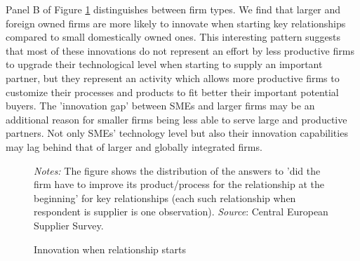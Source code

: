 \documentclass[final, dvipsnames, authoryear,12pt]{elsarticle}
\begin{document}
Panel B of Figure \ref{fig:innov} distinguishes between firm types. We find that larger and foreign owned firms are more likely to innovate when starting key relationships compared to small domestically owned ones. This interesting pattern suggests that most of these innovations do not represent an effort by less productive firms to upgrade their technological level when starting to supply an important partner, but they represent an activity which allows more productive firms to customize their processes and products to fit better their important potential buyers. The 'innovation gap' between SMEs and larger firms may be an additional reason for smaller firms being less able to serve large and productive partners. Not only SMEs' technology level but also their innovation capabilities may lag behind that of larger and globally integrated firms. 

    
 \begin{figure}[h]    
    \begin{center}
    \caption{Innovation when relationship starts}  
     \label{fig:innov}
    \end{center}
    {\footnotesize \textit{Notes:} The figure shows the distribution of the answers to ’did the firm have to improve its product/process for the relationship at the beginning’ for key relationships (each such relationship when respondent is supplier is one observation). \textit{Source}: Central European Supplier Survey.}     
\end{figure}   
    
\end{document}
